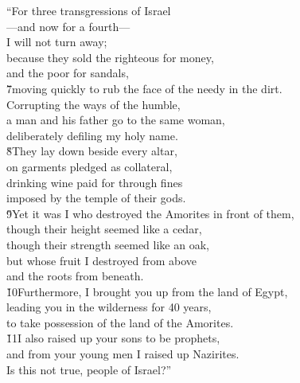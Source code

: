 \begin{poetry}
\poeml ``For three transgressions of Israel \\
\poemll    ---and now for a fourth--- \\
\poemlll       I will not turn away; \\
\poeml because they sold the righteous for money, \\
\poemll    and the poor for sandals, \\
\poeml \v{7}moving quickly to rub the face of the needy in the dirt. \\
\poeml Corrupting the ways of the humble, \\
\poemll    a man and his father go to the same woman, \\
\poemlll       deliberately defiling my holy name. \\
\poeml \v{8}They lay down beside every altar, \\
\poemll    on garments pledged as collateral, \\
\poeml drinking wine paid for through fines \\
\poemll    imposed by the temple of their gods. \\
\poeml \v{9}Yet it was I who destroyed the Amorites in front of them, \\
\poemll    though their height seemed like a cedar, \\
\poemll    though their strength seemed like an oak, \\
\poeml but whose fruit I destroyed from above \\
\poemll    and the roots from beneath. \\
\poeml \v{10}Furthermore, I brought you up from the land of Egypt, \\
\poemll    leading you in the wilderness for 40 years, \\
\poemlll       to take possession of the land of the Amorites. \\
\poeml \v{11}I also raised up your sons to be prophets, \\
\poemll    and from your young men I raised up Nazirites. \\
\poeml Is this not true, people of Israel?'' \\

\end{poetry}
